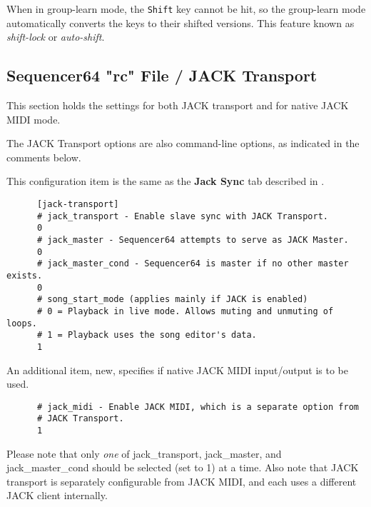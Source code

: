    When in group-learn mode, the \texttt{Shift} key cannot be hit, so the
   group-learn mode automatically converts the keys to their shifted versions.
   This feature known as \textsl{shift-lock} or \textsl{auto-shift}.

\subsection{Sequencer64 "rc" File / JACK Transport}
\label{subsec:seq64_rc_file_jack_transport}

   This section holds the settings for both JACK transport and for native JACK
   MIDI mode.

   The JACK Transport options are also command-line options, as indicated in
   the comments below.

   This configuration item is the same as the 
   \textbf{Jack Sync} tab described in
   .

   \begin{verbatim}
      [jack-transport]
      # jack_transport - Enable slave sync with JACK Transport.
      0
      # jack_master - Sequencer64 attempts to serve as JACK Master.
      0
      # jack_master_cond - Sequencer64 is master if no other master exists.
      0
      # song_start_mode (applies mainly if JACK is enabled)
      # 0 = Playback in live mode. Allows muting and unmuting of loops.
      # 1 = Playback uses the song editor's data.
      1
   \end{verbatim}

   An additional item, new, specifies if native JACK MIDI input/output is to be
   used.

   \begin{verbatim}
      # jack_midi - Enable JACK MIDI, which is a separate option from
      # JACK Transport.
      1
   \end{verbatim}

   Please note that only \textsl{one} of
   jack\_transport, jack\_master, and jack\_master\_cond should be selected
   (set to 1) at a time.
   Also note that JACK transport is separately configurable from
   JACK MIDI, and each uses a different JACK client internally.


